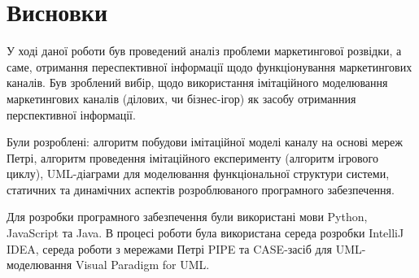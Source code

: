 \section*{Висновки}

У ході даної роботи був проведений аналіз проблеми маркетингової розвідки, а саме, отримання переспективної інформації щодо функціонування маркетингових каналів. Був зроблений вибір, щодо використання імітаційного моделювання маркетингових каналів (ділових, чи бізнес-ігор) як засобу отриманния перспективної інформації. 

Були розроблені: алгоритм побудови імітаційної моделі каналу на основі мереж Петрі, алгоритм проведення імітаційного експерименту (алгоритм ігрового циклу), UML-діаграми для моделювання функціональної структури системи, статичних та динамічних аспектів розроблюваного програмного забезпечення.

Для розробки програмного забезпечення були використані мови Python, JavaScript та Java. В процесі роботи була використана середа розробки IntelliJ IDEA, середа роботи з мережами Петрі PIPE та CASE-засіб для UML-моделювання Visual Paradigm for UML.
